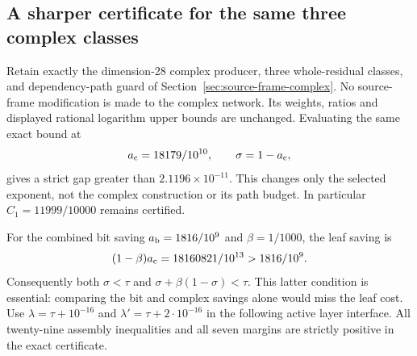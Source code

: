 \subsection{A sharper certificate for the same three complex classes}
\label{sec:source-corner-complex}

Retain exactly the dimension-28 complex producer, three whole-residual
classes, and dependency-path guard of
Section~\ref{sec:source-frame-complex}. No source-frame modification is
made to the complex network. Its weights, ratios and displayed rational
logarithm upper bounds are unchanged. Evaluating the same exact bound at
\[
 a_{\rm c}=18179/10^{10},\qquad \sigma=1-a_{\rm c},
\]
gives a strict gap greater than $2.1196\times10^{-11}$. This changes only
the selected exponent, not the complex construction or its path budget.
In particular $C_1=11999/10000$ remains certified.

For the combined bit saving $a_{\rm b}=1816/10^9$ and $\beta=1/1000$,
the leaf saving is
\[
 (1-\beta)a_{\rm c}=18160821/10^{13}>1816/10^9.
\]
Consequently both $\sigma<\tau$ and
$\sigma+\beta(1-\sigma)<\tau$. This latter condition is essential:
comparing the bit and complex savings alone would miss the leaf cost.
Use $\lambda=\tau+10^{-16}$ and $\lambda'=\tau+2\cdot10^{-16}$ in the
following active layer interface. All twenty-nine assembly inequalities
and all seven margins are strictly positive in the exact certificate.
